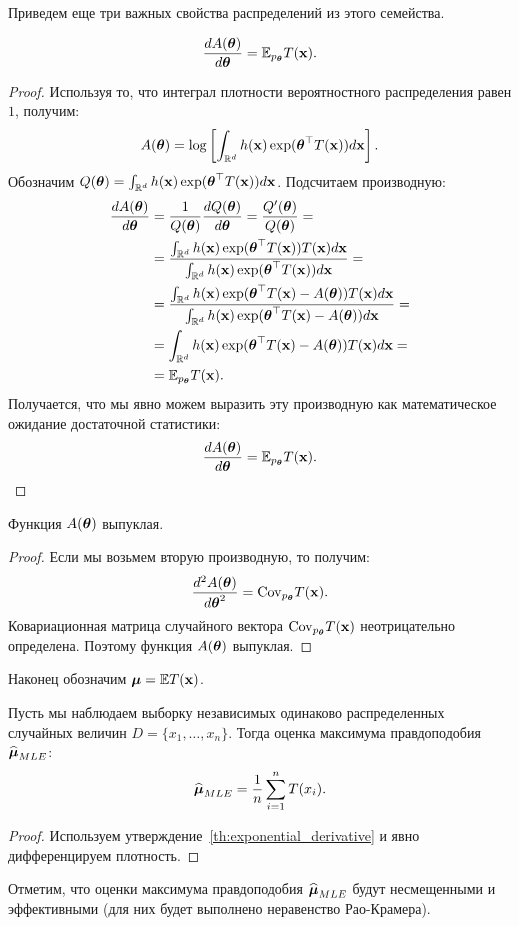 Приведем еще три важных свойства распределений из этого семейства.
\begin{Theorem}
\label{th:exponential_derivative}
\[
\frac{d A(\boldsymbol{\theta})}{d \boldsymbol{\theta}} = \mathbb{E}_{p_{\boldsymbol{\theta}}} T(\mathbf{x}).
\]
\end{Theorem}
\begin{proof}
Используя то, что интеграл плотности вероятностного распределения равен $1$, получим:
\[
A(\boldsymbol{\theta}) = \log \left[\int_{\mathbb{R}^{d}} h(\mathbf{x}) \exp( \boldsymbol{\theta}^\top T(\mathbf{x})) d \mathbf{x} \right].
\]
Обозначим $Q(\boldsymbol{\theta}) = \int_{\mathbb{R}^{d}} h(\mathbf{x}) \exp( \boldsymbol{\theta}^\top T(\mathbf{x})) d \mathbf{x}$.
Подсчитаем производную:
\begin{align*}
\frac{d A(\boldsymbol{\theta})}{d \boldsymbol{\theta}} &= \frac{1}{Q(\boldsymbol{\theta})} \frac{d Q(\boldsymbol{\theta})}{d \boldsymbol{\theta}} = \frac{Q'(\boldsymbol{\theta})}{Q(\boldsymbol{\theta})} = \\
&= \frac{\int_{\mathbb{R}^{d}} h(\mathbf{x}) \exp( \boldsymbol{\theta}^\top T(\mathbf{x})) T(\mathbf{x}) d \mathbf{x}}{\int_{\mathbb{R}^{d}} h(\mathbf{x}) \exp( \boldsymbol{\theta}^\top T(\mathbf{x})) d \mathbf{x}} = \\
&= \frac{\int_{\mathbb{R}^{d}} h(\mathbf{x}) \exp( \boldsymbol{\theta}^\top T(\mathbf{x}) - A(\boldsymbol{\theta})) T(\mathbf{x}) d \mathbf{x}}{\int_{\mathbb{R}^{d}} h(\mathbf{x}) \exp( \boldsymbol{\theta}^\top T(\mathbf{x}) - A(\boldsymbol{\theta})) d \mathbf{x}} = \\
&= \int_{\mathbb{R}^{d}} h(\mathbf{x}) \exp( \boldsymbol{\theta}^\top T(\mathbf{x}) - A(\boldsymbol{\theta})) T(\mathbf{x}) d \mathbf{x} = \\
&= \mathbb{E}_{p_{\boldsymbol{\theta}}} T(\mathbf{x}).
\end{align*}
Получается, что мы явно можем выразить эту производную как математическое ожидание достаточной статистики:
\[
\frac{d A(\boldsymbol{\theta})}{d \boldsymbol{\theta}} = \mathbb{E}_{p_{\boldsymbol{\theta}}} T(\mathbf{x}).
\]
\end{proof}
\begin{Theorem}
Функция $A(\boldsymbol{\theta})$ выпуклая.
\end{Theorem}
\begin{proof}
Если мы возьмем вторую производную, то получим:
\[
\frac{d^2 A(\boldsymbol{\theta})}{d \boldsymbol{\theta}^2} = \mathrm{Cov}_{p_{\boldsymbol{\theta}}} T(\mathbf{x}).
\]
Ковариационная матрица случайного вектора $\mathrm{Cov}_{p_{\boldsymbol{\theta}}} T(\mathbf{x})$ неотрицательно определена.
Поэтому функция $A(\boldsymbol{\theta})$ выпуклая.
\end{proof}

Наконец обозначим $\boldsymbol{\mu} = \mathbb{E} T(\mathbf{x})$.
\begin{Theorem}
Пусть мы наблюдаем выборку независимых одинаково распределенных случайных величин $D = \{x_1, \ldots, x_n\}$.
Тогда оценка максимума правдоподобия $\widehat{\boldsymbol{\mu}}_{MLE}$:
\[
\widehat{\boldsymbol{\mu}}_{MLE} = \frac{1}{n} \sum_{i = 1}^{n} T(x_i).
\]
\end{Theorem}
\begin{proof}
Используем утверждение~\ref{th:exponential_derivative} и явно дифференцируем плотность.
\end{proof}

Отметим, что оценки максимума правдоподобия $\widehat{\boldsymbol{\mu}}_{MLE}$ будут несмещенными и эффективными (для них будет выполнено неравенство Рао-Крамера).
